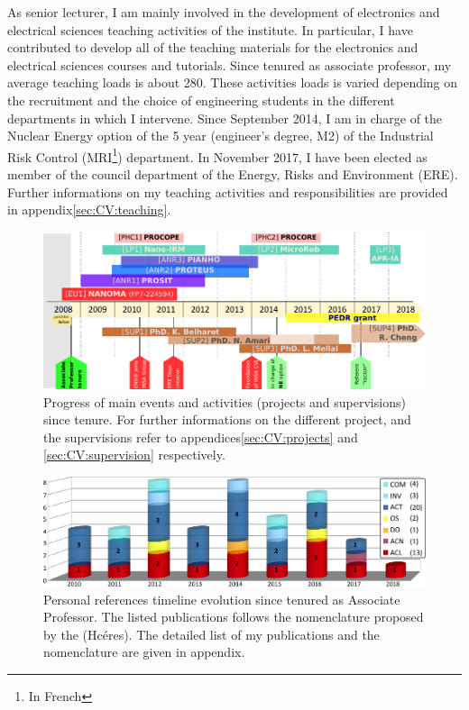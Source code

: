 \smallskip

As senior lecturer, I am mainly involved in the development of electronics and electrical sciences teaching activities of the institute.
In particular, I have contributed to develop all of the teaching materials for the electronics and electrical sciences  courses and tutorials.
Since tenured as associate professor, my average teaching loads is about \SI{280}{\hETD}.
These activities loads is varied depending on the recruitment and the choice of engineering students in the different departments in which I intervene. 
%
Since September 2014, I am in charge of the Nuclear Energy option of the 5 year (engineer's degree, M2) of the Industrial Risk Control (MRI\footnote{In French }) department. 
In November 2017, I have been elected as member of the council department of the Energy, Risks and Environment (ERE).
Further informations on my teaching activities and responsibilities are provided in appendix\;\ref{sec:CV:teaching}.



\SkipAndBreak[1.5]

%
\begin{figure}[tb]
  \centering
  \includegraphics[width=1\linewidth-1ex]{fig/chapI/dfolio_timeline} %
  \caption[Progress of main events and activities.]{Progress of main events and activities (\eg projects and supervisions) since  tenure. 
    For further informations on the different project, and the \PhD supervisions refer to appendices\;\ref{sec:CV:projects} and \ref{sec:CV:supervision} respectively.}\label{fig:timeline}
\end{figure}
%
\begin{figure}[tb]
  \centering
  \includegraphics[width=1\linewidth-1ex]{fig/chapI/dfolio_publisAll} %
  \caption[Personal references timeline since tenured as Associate Professor.]{Personal references timeline evolution since tenured as Associate Professor.
    The listed publications follows the nomenclature proposed by the { (Hcéres)}\cite{2018_hceres}.
    The detailed list of my publications and the nomenclature are given in appendix\;\RefAnnexeRef. }
  \label{fig:publis}
\end{figure}

